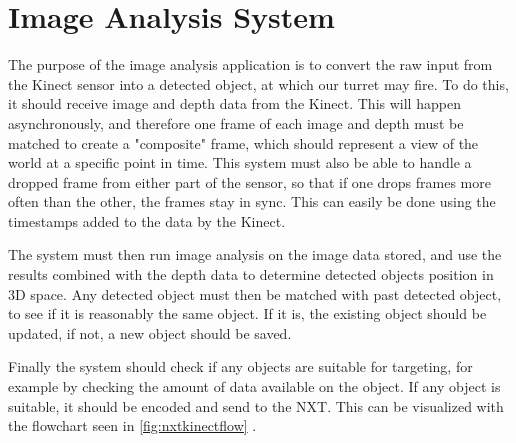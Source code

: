 \section{Image Analysis System}
The purpose of the image analysis application is to convert the raw input from the Kinect sensor into a detected
object, at which our turret may fire. To do this, it should receive image and depth data from the Kinect.
This will happen asynchronously, and therefore one frame of each image and depth must be matched to create a
"composite" frame, which should represent a view of the world at a specific point in time. This system must
also be able to handle a dropped frame from either part of the sensor, so that if one drops frames more
often than the other, the frames stay in sync. This can easily be done using the timestamps added to the data
by the Kinect.

The system must then run image analysis on the image data stored, and use the results combined with the depth
data to determine detected objects position in 3D space. Any detected object must then be matched with past
detected object, to see if it is reasonably the same object. If it is, the existing object should be updated,
if not, a new object should be saved.

Finally the system should check if any objects are suitable for targeting, for example by checking the amount of
data available on the object. If any object is suitable, it should be encoded and send to the NXT.
This can be visualized with the flowchart seen in \autoref{fig:nxtkinectflow} .

